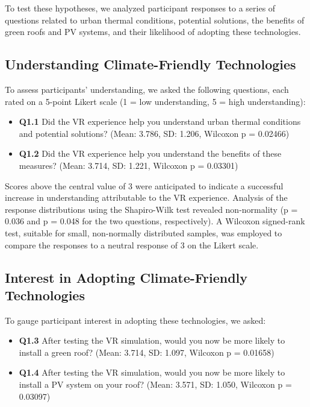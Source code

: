 \documentclass[draft, final]{vutinfth} %
\begin{document}
To test these hypotheses, we analyzed participant responses to a series of questions related to urban thermal conditions, potential solutions, the benefits of green roofs and PV systems, and their likelihood of adopting these technologies.  

\subsection{Understanding Climate-Friendly Technologies}

To assess participants' understanding, we asked the following questions, each rated on a 5-point Likert scale (1 = low understanding, 5 = high understanding):

\begin{itemize}
    \item \textbf{Q1.1} Did the VR experience help you understand urban thermal conditions and potential solutions? (Mean: 3.786, SD: 1.206, Wilcoxon p = 0.02466)
    \item \textbf{Q1.2} Did the VR experience help you understand the benefits of these measures? (Mean: 3.714, SD: 1.221, Wilcoxon p = 0.03301)
\end{itemize}

Scores above the central value of 3 were anticipated to indicate a successful increase in understanding attributable to the VR experience. Analysis of the response distributions using the Shapiro-Wilk test revealed non-normality (p = 0.036 and p = 0.048 for the two questions, respectively). A Wilcoxon signed-rank test, suitable for small, non-normally distributed samples, was employed to compare the responses to a neutral response of 3 on the Likert scale.

\subsection{Interest in Adopting Climate-Friendly Technologies}

To gauge participant interest in adopting these technologies, we asked:

\begin{itemize}
    \item \textbf{Q1.3} After testing the VR simulation, would you now be more likely to install a green roof? (Mean: 3.714, SD: 1.097, Wilcoxon p = 0.01658)
    \item \textbf{Q1.4} After testing the VR simulation, would you now be more likely to install a PV system on your roof? (Mean: 3.571, SD: 1.050, Wilcoxon p = 0.03097)
\end{itemize}
\end{document}

